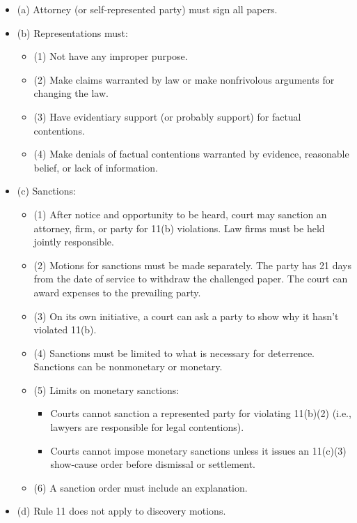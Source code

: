 \begin{itemize}
    \item (a) Attorney (or self-represented party) must sign all papers.
    \item (b) Representations must:
    \begin{itemize}
        \item (1) Not have any improper purpose.
        \item (2) Make claims warranted by law or make nonfrivolous arguments 
        for changing the law.
        \item (3) Have evidentiary support (or probably support) for factual 
        contentions.
        \item (4) Make denials of factual contentions warranted by evidence, 
        reasonable belief, or lack of information.
    \end{itemize}
    \item (c) Sanctions:
    \begin{itemize}
        \item (1) After notice and opportunity to be heard, court may sanction 
        an attorney, firm, or party for 11(b) violations. Law firms must be 
        held jointly responsible.
        \item (2) Motions for sanctions must be made separately. The party has 
        21 days from the date of service to withdraw the challenged paper. The 
        court can award expenses to the prevailing party.
        \item (3) On its own initiative, a court can ask a party to show why 
        it hasn't violated 11(b).
        \item (4) Sanctions must be limited to what is necessary for 
        deterrence. Sanctions can be nonmonetary or monetary.
        \item (5) Limits on monetary sanctions:
        \begin{itemize}
            \item Courts cannot sanction a represented party for violating 
            11(b)(2) (i.e., lawyers are responsible for legal contentions).
            \item Courts cannot impose monetary sanctions unless it issues an 
            11(c)(3) show-cause order before dismissal or settlement.
        \end{itemize}
        \item (6) A sanction order must include an explanation.
    \end{itemize}
    \item (d) Rule 11 does not apply to discovery motions.
\end{itemize}

